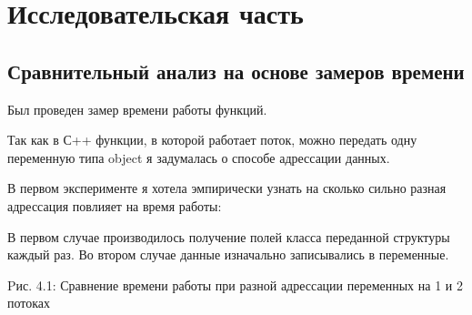 \documentclass[12pt]{report}
\begin{document}
\chapter{Исследовательская часть}

\section{Сравнительный анализ на основе замеров времени}

Был проведен замер времени работы функций.

Так как в С++ функции, в которой работает поток, можно передать одну переменную типа object я задумалась о способе адрессации данных.

В первом эксперименте я хотела эмпирически узнать на сколько сильно разная адрессация повлияет на время работы:  

В первом случае производилось получение полей класса переданной структуры каждый раз. 
Во втором случае данные изначально записывались в переменные.

\begin{center}
Pис. 4.1: Сравнение времени работы при разной адрессации переменных на 1 и 2 потоках
\end{center}
\end{document}
